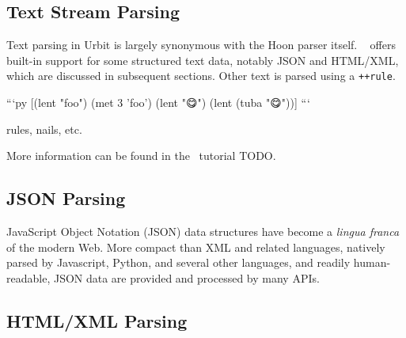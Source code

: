 \subsection{Text Stream Parsing}

Text parsing in Urbit is largely synonymous with the Hoon parser itself.  \zuse~ offers built-in support for some structured text data, notably JSON and HTML/XML, which are discussed in subsequent sections.  Other text is parsed using a \texttt{++rule}.

```py
[(lent "foo") (met 3 'foo') (lent "😋") (lent (tuba "😋"))]
```

rules, nails, etc.

More information can be found in the \shoe~tutorial TODO.

\subsection{JSON Parsing}

JavaScript Object Notation (JSON) data structures have become a \emph{lingua franca} of the modern Web.  More compact than XML and related languages, natively parsed by Javascript, Python, and several other languages, and readily human-readable, JSON data are provided and processed by many APIs.



\subsection{HTML/XML Parsing}
